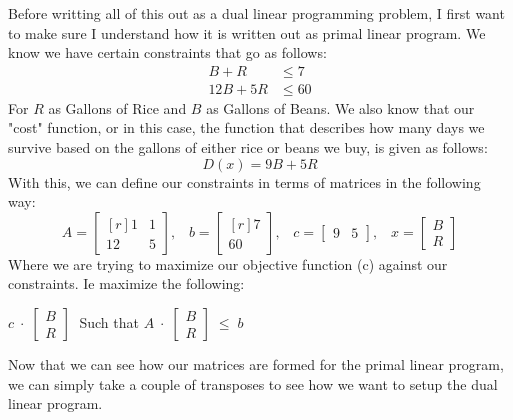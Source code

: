 \documentclass[11pt]{article}
\begin{document}
\begin{enumerate}
\begin{enumerate}
        Before writting all of this out as a dual linear programming problem, I
        first want to make sure I understand how it is written out as primal
        linear program. We know we have certain constraints that go as follows:
        \begin{align*}
             B  +  R &\leq 7  \\
            12B + 5R &\leq 60
        \end{align*}
        For $R$ as Gallons of Rice and $B$ as Gallons of Beans. We also know
        that our "cost" function, or in this case, the function that describes
        how many days we survive based on the gallons of either rice or beans
        we buy, is given as follows:
        \[
            D(x) = 9B + 5R
        \]
        With this, we can define our constraints in terms of matrices in the
        following way:
        \[
            A =
            \begin{bmatrix}[r]
                1   &   1   \\
                12  &   5
            \end{bmatrix}, \;\;\;
            b = 
            \begin{bmatrix}[r]
                7   \\
                60
            \end{bmatrix}, \;\;\;
            c = 
            \begin{bmatrix}
                9   &   5
            \end{bmatrix}, \;\;\;
            x = 
            \begin{bmatrix}
                B   \\
                R
            \end{bmatrix}
        \]
        Where we are trying to maximize our objective function (c) against our
        constraints. Ie maximize the following:
        \begin{center}
            $ c \;\cdot\; \begin{bmatrix} B  \\  R \end{bmatrix}\; $
            Such that
            $ A \;\cdot\; \begin{bmatrix} B  \\  R \end{bmatrix}\; \leq\; b $
        \end{center}

        Now that we can see how our matrices are formed for the primal linear
        program, we can simply take a couple of transposes to see how we want
        to setup the dual linear program.


\end{enumerate}
\end{enumerate}
\end{document}
